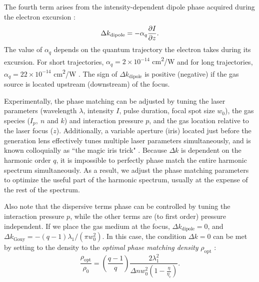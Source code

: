 The fourth term arises from the intensity-dependent dipole phase acquired during the electron excursion \cite{lewensteinTheoryHighharmonicGeneration1994,balcouGeneralizedPhasematchingConditions1997,salieresCoherenceControlHighOrder1995}:
\begin{equation}
\Delta k_{\textrm{dipole}} = - \alpha_q \pdv{I}{z}.
\label{eqn:deltak_atomic}
\end{equation}
The value of $\alpha_q$ depends on the quantum trajectory the electron takes during its excursion. For short trajectories, {$\alpha_q = 2 \times 10^{-14}$ cm\textsuperscript{2}/W} and for long trajectories, {$\alpha_q = 22 \times 10^{-14}$ cm\textsuperscript{2}/W} \cite{kazamiasPressureinducedPhaseMatching2011,balcouQuantumpathAnalysisPhase1999}. The sign of $\Delta k_{\textrm{dipole}}$ is positive (negative) if the gas source is located upstream (downstream) of the focus.

Experimentally, the phase matching can be adjusted by tuning the laser parameters (wavelength $\lambda$, intensity $I$, pulse duration, focal spot size $w_0$), the gas species ($I_p, \ n$ and $k$) and interaction pressure $p$, and the gas location relative to the laser focus ($z$). Additionally, a variable aperture (iris) located just before the generation lens effectively tunes multiple laser parameters simultaneously, and is known colloquially as ``the magic iris trick" \cite{kazamiasHighOrderHarmonic2002}. Because $\Delta k$ is dependent on the harmonic order $q$, it is impossible to perfectly phase match the entire harmonic spectrum simultaneously. As a result, we adjust the phase matching parameters to optimize the useful part of the harmonic spectrum, usually at the expense of the rest of the spectrum.

Also note that the dispersive terms phase can be controlled by tuning the interaction pressure $p$, while the other terms are (to first order) pressure independent. If we place the gas medium at the focus, $\Delta k_{\textrm{dipole}} = 0$, and $\Delta k_{\textrm{Gouy}} = -(q-1) \lambda_1 / (\pi w_0^2)$. In this case, the condition $\Delta k = 0$ can be met by setting to the density to the \textit{optimal phase matching density} $\rho_{\textrm{opt}}$ \cite{rothhardtAbsorptionlimitedPhasematchedHigh2014,pupeikisWaterWindowSoft2020}:
\begin{equation}
\frac{\rho_{\textrm{opt}}}{\rho_0} = \left( \frac{q-1}{q} \right) \frac{2 \lambda_1^2}{\Delta n w_0^2 \left(1 - \frac{\eta}{\eta_c}\right)}.
\label{eqn:phase_matching_density}
\end{equation}


